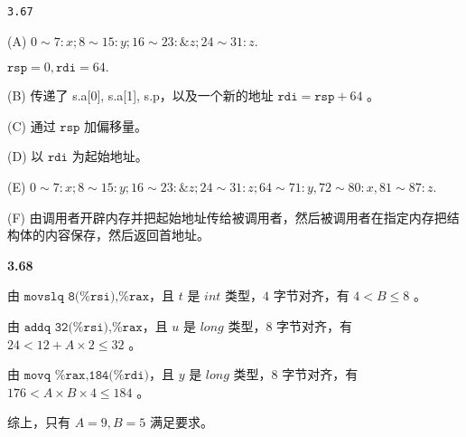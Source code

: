 \documentclass{article}
\begin{document}
\texttt{3.67}

(A) $0 \sim 7: x; 8\sim 15: y; 16\sim 23: \&z; 24\sim 31: z.$

$\texttt{rsp} = 0, \texttt{rdi} = 64.$

(B) 传递了 s.a[0], s.a[1], s.p，以及一个新的地址 $\texttt{rdi} = \texttt{rsp} + 64$ 。

(C) 通过 $\texttt{rsp}$ 加偏移量。

(D) 以 $\texttt{rdi}$ 为起始地址。

(E) $0 \sim 7: x; 8\sim 15: y; 16\sim 23: \&z; 24\sim 31: z; 64\sim 71: y, 72\sim 80: x, 81\sim 87: z.$

(F) 由调用者开辟内存并把起始地址传给被调用者，然后被调用者在指定内存把结构体的内容保存，然后返回首地址。


\textbf{3.68}

由 $\texttt{movslq 8(\%rsi),\%rax}$，且 $t$ 是 $int$ 类型，$4$ 字节对齐，有 $4 < B \le 8$ 。

由 $\texttt{addq 32(\%rsi),\%rax}$，且 $u$ 是 $long$ 类型，$8$ 字节对齐，有 $24 < 12 + A\times 2 \le 32$ 。

由 $\texttt{movq \%rax,184(\%rdi)}$，且 $y$ 是 $long$ 类型，$8$ 字节对齐，有 $176 < A\times B\times 4 \le 184$ 。

综上，只有 $A = 9, B = 5$ 满足要求。
\end{document}
